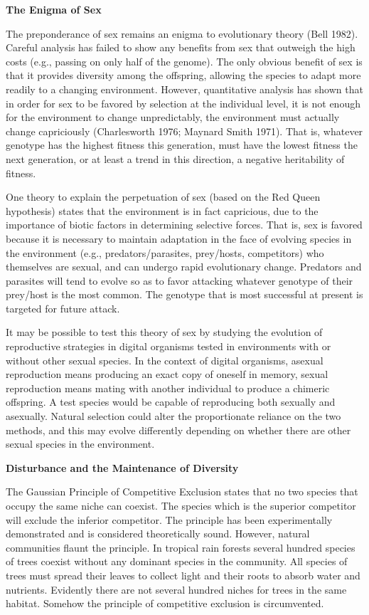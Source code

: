 \LP
\bf The Enigma of Sex\rm
\eLP

The preponderance of sex remains an enigma to evolutionary theory (Bell 1982).
Careful analysis has failed to show any benefits from sex that outweigh
the high costs (e.g., passing on only half of the genome).  The only
obvious benefit of sex is that it provides diversity among the
offspring, allowing the species to adapt more readily to a changing
environment.  However, quantitative analysis has shown that in order
for sex to be favored by selection at the individual level, it is not
enough for the environment to change unpredictably, the environment must
actually change capriciously (Charlesworth 1976; Maynard Smith 1971).
That is, whatever genotype has the
highest fitness this generation, must have the lowest fitness the next
generation, or at least a trend in this direction, a negative heritability
of fitness.

One theory to explain the perpetuation of sex (based on the Red Queen
hypothesis) states that the environment is in fact capricious, due to
the importance of biotic factors in determining
selective forces.  That is, sex is favored because it is necessary to
maintain adaptation in the face of evolving species in the environment
(e.g., predators/parasites, prey/hosts, competitors) who themselves are
sexual, and can undergo rapid evolutionary change.  Predators and
parasites will tend to evolve so as to favor attacking whatever
genotype of their prey/host is the most common.  The genotype that
is most successful at present is targeted for future attack.

It may be possible to test this theory of sex by studying the evolution
of reproductive strategies in digital organisms tested in environments
with or without other sexual species.  In the context of digital organisms,
asexual reproduction means producing an exact copy of oneself in memory,
sexual reproduction means mating with another individual to produce a
chimeric offspring.  A test species would be capable of reproducing both
sexually and asexually.  Natural selection could alter the proportionate
reliance on the two methods, and this may evolve differently depending
on whether there are other sexual species in the environment.

\LP
\bf Disturbance and the Maintenance of Diversity\rm
\eLP

The Gaussian Principle of Competitive Exclusion states that no two species
that occupy the same niche can coexist.  The species which is the superior
competitor will exclude the inferior competitor.  The principle has been
experimentally demonstrated and is considered theoretically sound.  However,
natural communities flaunt the principle.  In tropical rain forests several
hundred species of trees coexist without any dominant species in the
community.  All species of trees must spread their leaves to collect light
and their roots to absorb water and nutrients.  Evidently there are not
several hundred niches for trees in the same habitat.  Somehow the principle
of competitive exclusion is circumvented.


